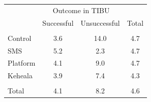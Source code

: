 \scriptsize{
\begin{tabular}{lccc}
\hline \hline
\rowcolor{yellow!15} & \multicolumn{2}{c}{Outcome in TIBU} &  \\
\rowcolor{yellow!15} & Successful & Unsuccessful & Total \\
\hline \\[-8pt] 
Control     & 3.6 & 14.0 & 4.7 \\
SMS     & 5.2 & 2.3 & 4.7 \\
Platform     & 4.1 & 9.0 & 4.7 \\
Keheala     & 3.9 & 7.4 & 4.3 \\
\hline \\[-8pt]
Total       & 4.1 & 8.2 & 4.6 \\
\hline \hline
\end{tabular}}